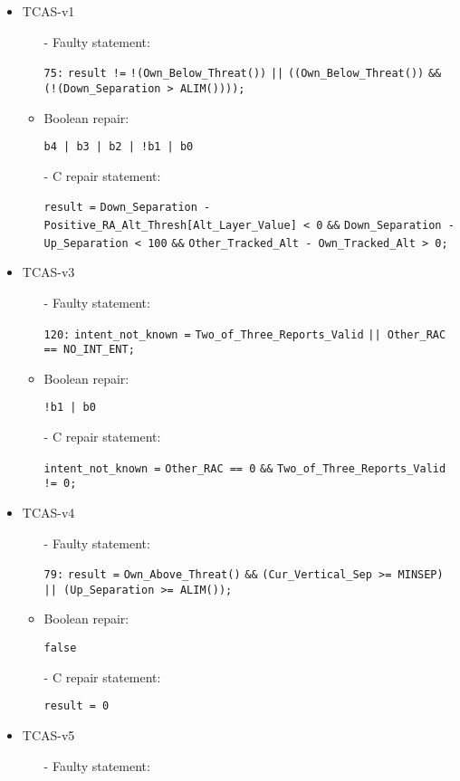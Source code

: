 \begin{itemize}
\item TCAS-v1
\begin{itemize}
\item[-] Faulty statement:

\lstinline|75:| \lstinline|result !=| \lstinline|!(Own_Below_Threat())| \lstinline{||} \lstinline|((Own_Below_Threat())| \lstinline|&&| \lstinline|(!(Down_Separation > ALIM())));|
\item[-] Boolean repair:

\lstinline{b4 | b3 | b2 | !b1 | b0}
\item[-] C repair statement: 

\lstinline|result =| \lstinline|Down_Separation - Positive_RA_Alt_Thresh[Alt_Layer_Value] < 0| \lstinline|&&| \lstinline|Down_Separation - Up_Separation < 100| \lstinline|&&| \lstinline|Other_Tracked_Alt - Own_Tracked_Alt > 0;|
\end{itemize}

\item TCAS-v3
\begin{itemize}
\item[-] Faulty statement:

\lstinline|120:| \lstinline|intent_not_known =| \lstinline|Two_of_Three_Reports_Valid| \lstinline{|| Other_RAC == NO_INT_ENT;}
\item[-] Boolean repair:

\lstinline{!b1 | b0}
\item[-] C repair statement: 

\lstinline|intent_not_known =| \lstinline|Other_RAC == 0| \lstinline|&&| \lstinline|Two_of_Three_Reports_Valid != 0;|
\end{itemize}

\item TCAS-v4
\begin{itemize}
\item[-] Faulty statement:

\lstinline|79:| \lstinline|result =| \lstinline|Own_Above_Threat()| \lstinline|&&| \lstinline|(Cur_Vertical_Sep >= MINSEP)| \lstinline{|| (Up_Separation >= ALIM());}
\item[-] Boolean repair:

\lstinline{false}
\item[-] C repair statement: 

\lstinline|result = 0|
\end{itemize}

\item TCAS-v5
\begin{itemize}
\item[-] Faulty statement:


\end{itemize}
\end{itemize}
